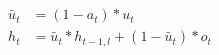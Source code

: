 \documentclass{article}
\begin{document}
\begin{align*}
	\tilde{u_{t}} &= (1 - a_{t}) * u_{t} \\
	h_{t} &= \tilde{u_{t}} * h_{t-1,l} + (1-\tilde{u_{t}})*o_{t}
\end{align*}
\end{document}
